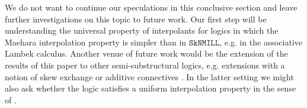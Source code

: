 \documentclass[sn-mathphys-num]{sn-jnl}%
\newcommand{\SkNMILL}{$\mathtt{SkNMILL}$}
\theoremstyle{thmstyleone}%
\theoremstyle{thmstyletwo}%
\theoremstyle{thmstylethree}%
\begin{document}
We do not want to continue our speculations in this conclusive section and leave further investigations on this topic to future work.
Our first step will be understanding the universal property of interpolants for logics in which the Maehara interpolation property is simpler than in \SkNMILL, e.g. in the associative Lambek calculus. 
Another venue of future work would be the  extension of the results of this paper to other semi-substructural logics, e.g. extensions with a notion of skew exchange \cite{veltri:coherence:2021} or additive connectives \cite{VW:2023}.
In the latter setting we might also ask whether the logic satisfies a uniform interpolation property in the sense of \cite{alizadeh:uniform:2014}.







\end{document}
